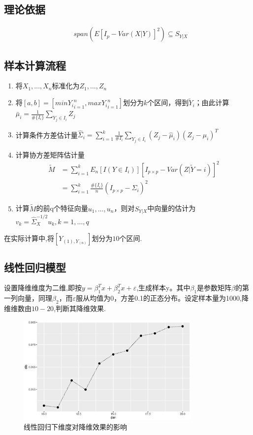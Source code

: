 \subsection{理论依据}
\begin{align*}
    &span(E[I_p-Var(X|Y)]^2) \subseteq S_{Y|X}
\end{align*}
\subsection{样本计算流程}
\begin{enumerate}
    \item 将$X_1,\dots,X_n$标准化为$Z_1,\dots,Z_n$
    \item 将$[a,b]=[min{Y_i}_{i=1}^n,max{Y_i}_{i=1}^n]$划分为$k$个区间，得到$\widetilde{Y}_i$；由此计算$\bar{\mu}_i=\frac{1}{\#\{I_i\}}\sum_{Y_j\in I_i}Z_j$
    \item 计算条件方差估计量$\hat{\Sigma}_i=\sum_{i=1}^k\frac{1}{\#I_i}\sum_{Y_j\in I_i}(Z_j-\hat{\mu}_i)(Z_j-\hat{\mu}_i)^T$
    \item 计算协方差矩阵估计量
    \begin{align*}
        \widetilde{M}&=\sum_{i=1}^kE_n[I(Y\in I_i)] [I_{p\times p}-Var(Z|\widetilde{Y}=i)]^2 \\
        &=\sum_{i=1}^k\frac{\#\{I_i\}}{n}(I_{p\times p}-\hat{\Sigma}_i)^2
    \end{align*}
    \item 计算$\widetilde{M}$的前q个特征向量$u_1,\dots,u_n$，则对$S_{Y|X}$中向量的估计为$v_k=\hat{\Sigma}_{X}^{-1/2}u_k,k=1,\dots,q$
    
\end{enumerate}
在实际计算中,将$[Y_{(1),Y_(n)}]$划分为$10$个区间.
\subsection{线性回归模型}
设置降维维度为二维,即按$y=\beta_1^Tx+\beta_2^Tx+\varepsilon$,生成样本y。其中$\beta_1$是参数矩阵$\beta$的第一列向量，同理$\beta_2$，而$\varepsilon$服从均值为0，方差0.1的正态分布。设定样本量为1000,降维维数由$10-20$,判断其降维效果.
\begin{figure}[H]
    \centering
    \includegraphics[width=0.8\textwidth]{image/norm_save.eps}
    \caption{线性回归下维度对降维效果的影响}
\end{figure}


